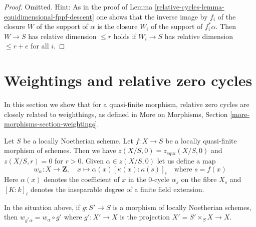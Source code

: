 \begin{proof}
Omitted. Hint: As in the proof of Lemma \ref{relative-cycles-lemma-equidimensional-fppf-descent}
one shows that the inverse image by $f_i$ of the closure $W$ of the support of
$\alpha$ is the closure $W_i$ of the support of $f_i^*\alpha$. Then
$W \to S$ has relative dimension $\leq r$ holds if $W_i \to S$
has relative dimension $\leq r + e$ for all $i$.
\end{proof}

\section{Weightings and relative zero cycles}
\label{relative-cycles-section-weightings}
In this section we show that for a quasi-finite morphism,
relative zero cycles are closely related to weighthings, as defined in
More on Morphisms, Section \ref{more-morphisms-section-weightings}.

\medskip\noindent
Let $S$ be a locally Noetherian scheme. Let $f : X \to S$ be a locally
quasi-finite morphism of schemes. Then we have $z(X/S, 0) = z_{equi}(X/S, 0)$
and $z(X/S, r) = 0$ for $r > 0$. Given $\alpha \in z(X/S, 0)$ let us
define a map
$$
w_\alpha : X \longrightarrow \mathbf{Z},\quad
x \mapsto \alpha(x) [\kappa(x) : \kappa(s)]_i \quad\text{where }s = f(x)
$$
Here $\alpha(x)$ denotes the coefficient of $x$ in the $0$-cycle
$\alpha_s$ on the fibre $X_s$ and $[K : k]_i$ denotes the inseparable
degree of a finite field extension.

\begin{lemma}
\label{relative-cycles-lemma-weightings-pre}

In the situation above, if $g : S' \to S$ is a morphism of locally
Noetherian schemes, then $w_{g^*\alpha} = w_\alpha \circ g'$ where
$g' : X' \to X$ is the projection $X' = S' \times_S X \to X$.
\end{lemma}

